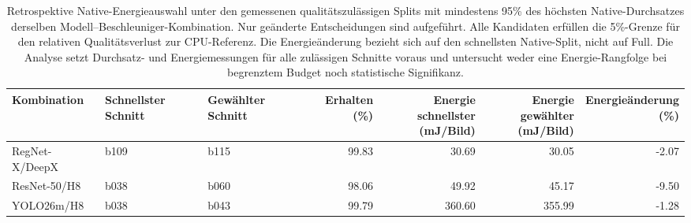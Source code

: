 \begin{table}[t]
\centering\small
\setlength{\tabcolsep}{3pt}
\caption{Retrospektive Native-Energieauswahl unter den gemessenen qualitätszulässigen Splits mit mindestens 95\% des höchsten Native-Durchsatzes derselben Modell--Beschleuniger-Kombination. Nur geänderte Entscheidungen sind aufgeführt. Alle Kandidaten erfüllen die 5\%-Grenze für den relativen Qualitätsverlust zur CPU-Referenz. Die Energieänderung bezieht sich auf den schnellsten Native-Split, nicht auf Full. Die Analyse setzt Durchsatz- und Energiemessungen für alle zulässigen Schnitte voraus und untersucht weder eine Energie-Rangfolge bei begrenztem Budget noch statistische Signifikanz.}
\label{tab:energy-floor-95}
\begin{tabular*}{\textwidth}{@{\extracolsep{\fill}}lllrrrr@{}}
\toprule
Kombination & Schnellster Schnitt & Gewählter Schnitt & Erhalten (\%) & \shortstack{Energie schnellster\\(mJ/Bild)} & \shortstack{Energie gewählter\\(mJ/Bild)} & \shortstack{Energieänderung\\(\%)} \\
\midrule
RegNet-X/DeepX & b109 & b115 & 99.83 & 30.69 & 30.05 & -2.07 \\
ResNet-50/H8 & b038 & b060 & 98.06 & 49.92 & 45.17 & -9.50 \\
YOLO26m/H8 & b038 & b043 & 99.79 & 360.60 & 355.99 & -1.28 \\
\bottomrule
\end{tabular*}
\end{table}
